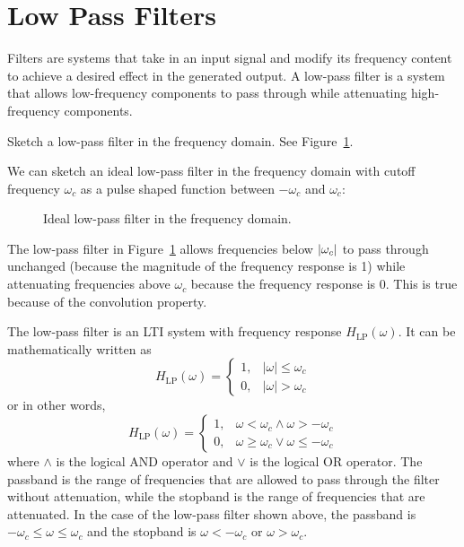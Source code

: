 \section{Low Pass Filters}
Filters are systems that take in an input signal and modify its frequency content to achieve a desired effect in the generated output. A low-pass filter is a system that allows low-frequency components to pass through while attenuating high-frequency components.
\begin{popquiz}
    Sketch a low-pass filter in the frequency domain.
    \popqsplit
    See Figure~\ref{fig:lowpass_filter-ideal}.
\end{popquiz}
We can sketch an ideal low-pass filter in the frequency domain with cutoff frequency \(\omega_c\) as a pulse shaped function between \(-\omega_c\) and \(\omega_c\):
\begin{figure}[h]
    \centering
{}
\caption{Ideal low-pass filter in the frequency domain.}
\label{fig:lowpass_filter-ideal}
\end{figure}
The low-pass filter in Figure~\ref{fig:lowpass_filter-ideal} allows frequencies below \(\left\lvert\omega_c\right\rvert\) to pass through unchanged (because the magnitude of the frequency response is 1) while attenuating frequencies above \(\omega_c\) because the frequency response is 0. This is true because of the convolution property. 

The low-pass filter is an LTI system with frequency response $H_{\text{LP}}(\omega)$. It can be mathematically written as 
\[
H_{\text{LP}}(\omega) = \begin{cases}
    1, & |\omega| \leq \omega_c \\
    0, & |\omega| > \omega_c
\end{cases}
\]
or in other words, 
\[
H_{\text{LP}}(\omega) = \begin{cases}
    1, & \omega < \omega_c \land \omega > -\omega_c \\
    0, & \omega \geq \omega_c \lor \omega \leq -\omega_c
\end{cases}
\]
where $\land$ is the logical AND operator and $\lor$ is the logical OR operator. The passband is the range of frequencies that are allowed to pass through the filter without attenuation, while the stopband is the range of frequencies that are attenuated. In the case of the low-pass filter shown above, the passband is \(-\omega_c \leq \omega \leq \omega_c\) and the stopband is \(\omega < -\omega_c\) or \(\omega > \omega_c\).

